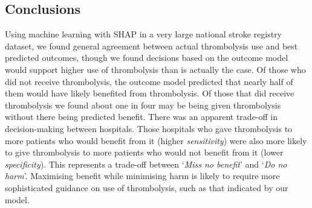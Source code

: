 \subsection{Conclusions}

Using machine learning with SHAP in a very large national stroke registry dataset, we found general agreement between actual thrombolysis use and best predicted outcomes, though we found decisions based on the outcome model would support higher use of thrombolysis than is actually the case. Of those who did not receive thrombolysis, the outcome model predicted that nearly half of them would have likely benefited from thrombolysis. Of those that did receive thrombolysis we found about one in four may be being given thrombolysis without there being predicted benefit. There was an apparent trade-off in decision-making between hospitals. Those hospitals who gave thrombolysis to more patients who would benefit from it (higher \textit{sensitivity}) were also more likely to give thrombolysis to more patients who would not benefit from it (lower \textit{specificity}). This represents a trade-off between `\textit{Miss no benefit}' and `\textit{Do no harm}'. Maximising benefit while minimising harm is likely to require more sophisticated guidance on use of thrombolysis, such as that indicated by our model.